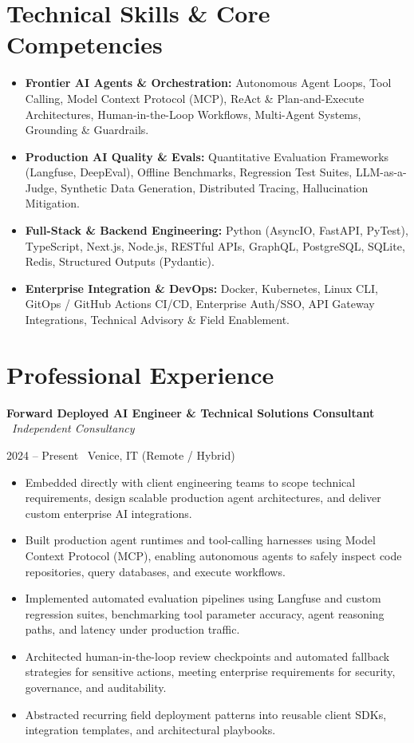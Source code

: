 \documentclass[a4paper,10pt]{article}
\newcommand{\role}[4]{%
  \vspace{2pt}\noindent
  \begin{minipage}[t]{0.70\textwidth}\raggedright\textbf{#1} \textbullet\ \textit{#3}\end{minipage}%
  \hfill
  \begin{minipage}[t]{0.28\textwidth}\raggedleft\footnotesize\color{gray}#2 \textbullet\ #4\end{minipage}%
  \vspace{1pt}%
}
\begin{document}
\section{Technical Skills \& Core Competencies}
\begin{itemize}[leftmargin=1.2em, itemsep=2pt]
  \item \textbf{Frontier AI Agents \& Orchestration:} Autonomous Agent Loops, Tool Calling, Model Context Protocol (MCP), ReAct \& Plan-and-Execute Architectures, Human-in-the-Loop Workflows, Multi-Agent Systems, Grounding \& Guardrails.
  \item \textbf{Production AI Quality \& Evals:} Quantitative Evaluation Frameworks (Langfuse, DeepEval), Offline Benchmarks, Regression Test Suites, LLM-as-a-Judge, Synthetic Data Generation, Distributed Tracing, Hallucination Mitigation.
  \item \textbf{Full-Stack \& Backend Engineering:} Python (AsyncIO, FastAPI, PyTest), TypeScript, Next.js, Node.js, RESTful APIs, GraphQL, PostgreSQL, SQLite, Redis, Structured Outputs (Pydantic).
  \item \textbf{Enterprise Integration \& DevOps:} Docker, Kubernetes, Linux CLI, GitOps / GitHub Actions CI/CD, Enterprise Auth/SSO, API Gateway Integrations, Technical Advisory \& Field Enablement.
\end{itemize}

\section{Professional Experience}

\role{Forward Deployed AI Engineer \& Technical Solutions Consultant}{2024 -- Present}{Independent Consultancy}{Venice, IT (Remote / Hybrid)}
\begin{itemize}
  \item Embedded directly with client engineering teams to scope technical requirements, design scalable production agent architectures, and deliver custom enterprise AI integrations.
  \item Built production agent runtimes and tool-calling harnesses using Model Context Protocol (MCP), enabling autonomous agents to safely inspect code repositories, query databases, and execute workflows.
  \item Implemented automated evaluation pipelines using Langfuse and custom regression suites, benchmarking tool parameter accuracy, agent reasoning paths, and latency under production traffic.
  \item Architected human-in-the-loop review checkpoints and automated fallback strategies for sensitive actions, meeting enterprise requirements for security, governance, and auditability.
  \item Abstracted recurring field deployment patterns into reusable client SDKs, integration templates, and architectural playbooks.
\end{itemize}
\end{document}
